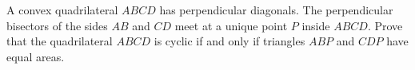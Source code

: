 A convex quadrilateral $ABCD$ has perpendicular diagonals.
The perpendicular bisectors of the sides $AB$ and $CD$ meet
at a unique point $P$ inside $ABCD$.
Prove that the quadrilateral $ABCD$ is cyclic
if and only if triangles $ABP$ and $CDP$ have equal areas.
